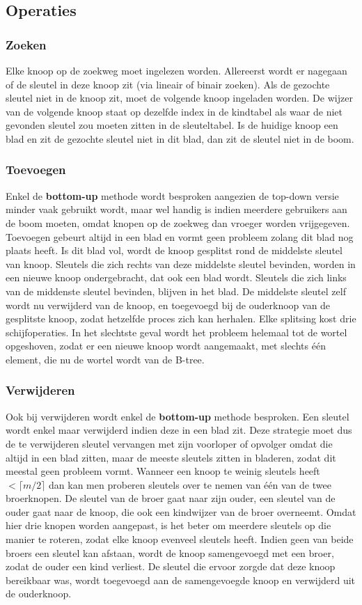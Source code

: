 \documentclass{report}
\begin{document}
	\subsection{Operaties}
	\subsubsection{Zoeken}
	Elke knoop op de zoekweg moet ingelezen worden. Allereerst wordt er nagegaan of de sleutel in deze knoop zit (via lineair of binair zoeken). Als de gezochte sleutel niet in de knoop zit, moet de volgende knoop ingeladen worden. De wijzer van de volgende knoop staat op dezelfde index in de kindtabel als waar de niet gevonden sleutel zou moeten zitten in de sleuteltabel. Is de huidige knoop een blad en zit de gezochte sleutel niet in dit blad, dan zit de sleutel niet in de boom. 
	\subsubsection{Toevoegen}
	Enkel de \textbf{bottom-up} methode wordt besproken aangezien de top-down versie minder vaak gebruikt wordt, maar wel handig is indien meerdere gebruikers aan de boom moeten, omdat knopen op de zoekweg dan vroeger worden vrijgegeven. Toevoegen gebeurt altijd in een blad en vormt geen probleem zolang dit blad nog plaats heeft. Is dit blad vol, wordt de knoop gesplitst rond de middelste sleutel van knoop. Sleutels die zich rechts van deze middelste sleutel bevinden, worden in een nieuwe knoop ondergebracht, dat ook een blad wordt. Sleutels die zich links van de middenste sleutel bevinden, blijven in het blad. De middelste sleutel zelf wordt nu verwijderd van de knoop, en toegevoegd bij de ouderknoop van de gesplitste knoop, zodat hetzelfde proces zich kan herhalen. Elke splitsing kost drie schijfoperaties. In het slechtste geval wordt het probleem helemaal tot de wortel opgeshoven, zodat er een nieuwe knoop wordt aangemaakt, met slechts één element, die nu de wortel wordt van de B-tree.
	\subsubsection{Verwijderen}
	Ook bij verwijderen wordt enkel de \textbf{bottom-up} methode besproken. Een sleutel wordt enkel maar verwijderd indien deze in een blad zit. Deze strategie moet dus de te verwijderen sleutel vervangen met zijn voorloper of opvolger omdat die altijd in een blad zitten, maar de meeste sleutels zitten in bladeren, zodat dit meestal geen probleem vormt. Wanneer een knoop te weinig sleutels heeft $< \lceil m/2 \rceil$ dan kan men proberen sleutels over te nemen van één van de twee broerknopen. De sleutel van de broer gaat naar zijn ouder, een sleutel van de ouder gaat naar de knoop, die ook een kindwijzer van de broer overneemt. Omdat hier drie knopen worden aangepast, is het beter om meerdere sleutels op die manier te roteren, zodat elke knoop evenveel sleutels heeft. Indien geen van beide broers een sleutel kan afstaan, wordt de knoop samengevoegd met een broer, zodat de ouder een kind verliest. De sleutel die ervoor zorgde dat deze knoop bereikbaar was, wordt toegevoegd aan de samengevoegde knoop en verwijderd uit de ouderknoop.
\end{document}
